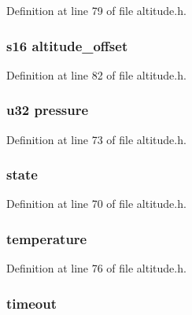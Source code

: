 \-Definition at line 79 of file altitude.\-h.

\hypertarget{structalt_aef78b8fb382f9cd58ccbec4471101398}{
\subsubsection[{altitude\-\_\-offset}]{\setlength{\rightskip}{0pt plus 5cm}s16 {\bf altitude\-\_\-offset}}}\label{structalt_aef78b8fb382f9cd58ccbec4471101398}


\-Definition at line 82 of file altitude.\-h.

\hypertarget{structalt_a3dd5bcc30ce1408a2e33442767ef6971}{
\subsubsection[{pressure}]{\setlength{\rightskip}{0pt plus 5cm}u32 {\bf pressure}}}\label{structalt_a3dd5bcc30ce1408a2e33442767ef6971}


\-Definition at line 73 of file altitude.\-h.

\hypertarget{structalt_ac6b2518df4ca45cee089e61f152572b2}{
\subsubsection[{state}]{ {\bf state}}}\label{structalt_ac6b2518df4ca45cee089e61f152572b2}


\-Definition at line 70 of file altitude.\-h.

\hypertarget{structalt_a157379ac5ab58014f162220393ace12d}{
\subsubsection[{temperature}]{ {\bf temperature}}}\label{structalt_a157379ac5ab58014f162220393ace12d}


\-Definition at line 76 of file altitude.\-h.

\hypertarget{structalt_a735bf6536b07682f96c9417b0f1e9079}{
\subsubsection[{timeout}]{ {\bf timeout}}}\label{structalt_a735bf6536b07682f96c9417b0f1e9079}



